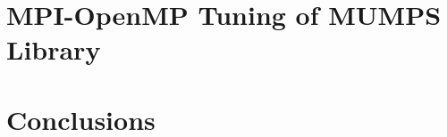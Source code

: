 









\section{MPI-OpenMP Tuning of MUMPS Library}
\label{subseq:mpi-openmp}


\section{Conclusions}
\label{subseq:conclusions}







